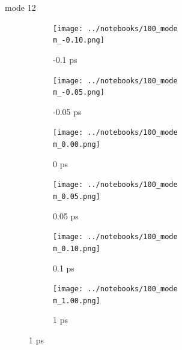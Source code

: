\documentclass{beamer}
\begin{document}
\renewcommand\m{12}
\begin{frame}{mode \m}
	\begin{figure}
		\centering
		\begin{subfigure}[b]{\w\textwidth}
			\centering
			\texttt{[image: ../notebooks/100\_mode\\m\_-0.10.png]}
			\caption{-0.1 ps}
		\end{subfigure}
		\begin{subfigure}[b]{\w\textwidth}
			\centering
			\texttt{[image: ../notebooks/100\_mode\\m\_-0.05.png]}
			\caption{-0.05 ps}
		\end{subfigure}
		\begin{subfigure}[b]{\w\textwidth}
			\centering
			\texttt{[image: ../notebooks/100\_mode\\m\_0.00.png]}
			\caption{0 ps}
		\end{subfigure}
		\begin{subfigure}[b]{\w\textwidth}
			\centering
			\texttt{[image: ../notebooks/100\_mode\\m\_0.05.png]}
			\caption{0.05 ps}
		\end{subfigure}
		\begin{subfigure}[b]{\w\textwidth}
			\centering
			\texttt{[image: ../notebooks/100\_mode\\m\_0.10.png]}
			\caption{0.1 ps}
		\end{subfigure}
		\begin{subfigure}[b]{\w\textwidth}
			\centering
			\texttt{[image: ../notebooks/100\_mode\\m\_1.00.png]}
			\caption{1 ps}
		\end{subfigure}
	\end{figure}
\end{frame}
\end{document}
